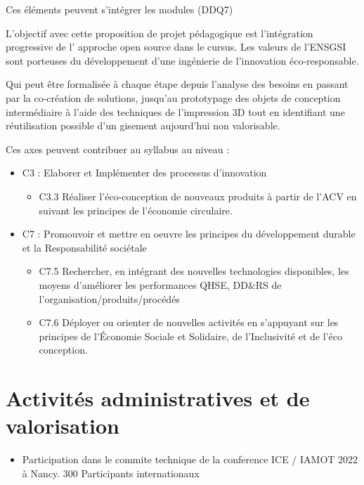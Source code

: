 \documentclass[
  11pt,
]{article}
\providecommand{\tightlist}{%
  \setlength{\itemsep}{0pt}\setlength{\parskip}{0pt}}\usepackage{longtable,booktabs,array}
\begin{document}
Ces éléments peuvent s'intégrer les modules (DDQ7)

L'objectif avec cette proposition de projet pédagogique est
l'intégration progressive de l' approche open source dans le cursus. Les
valeurs de l'ENSGSI sont porteuses du développement d'une ingénierie de
l'innovation éco-responsable.

Qui peut être formalisée à chaque étape depuis l'analyse des besoins en
passant par la co-création de solutions, jusqu'au prototypage des objets
de conception intermédiaire à l'aide des techniques de l'impression 3D
tout en identifiant une réutilisation possible d'un gisement aujourd'hui
non valorisable.

Ces axes peuvent contribuer au syllabus au niveau :

\begin{itemize}
\item
  C3 : Elaborer et Implémenter des processus d'innovation

  \begin{itemize}
  \tightlist
  \item
    C3.3 Réaliser l'éco-conception de nouveaux produits à partir de
    l'ACV en suivant les principes de l'économie circulaire.
  \end{itemize}
\item
  C7 : Promouvoir et mettre en oeuvre les principes du développement
  durable et la Responsabilité sociétale

  \begin{itemize}
  \item
    C7.5 Rechercher, en intégrant des nouvelles technologies
    disponibles, les moyens d'améliorer les performances QHSE, DD\&RS de
    l'organisation/produits/procédés
  \item
    C7.6 Déployer ou orienter de nouvelles activités en s'appuyant sur
    les principes de l'Économie Sociale et Solidaire, de l'Inclusivité
    et de l'éco conception.
  \end{itemize}
\end{itemize}

\hypertarget{activituxe9s-administratives-et-de-valorisation}{%
\section{Activités administratives et de
valorisation}\label{activituxe9s-administratives-et-de-valorisation}}

\begin{itemize}
\tightlist
\item
  Participation dans le commite technique de la conference ICE / IAMOT
  2022 à Nancy. 300 Participants internationaux
\end{itemize}
\end{document}
